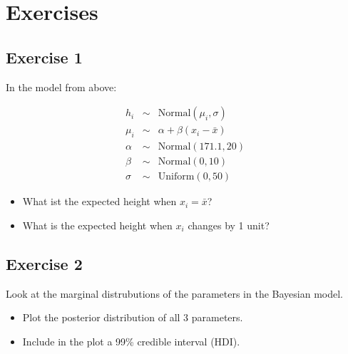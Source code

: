 \documentclass[
]{book}
\providecommand{\tightlist}{%
  \setlength{\itemsep}{0pt}\setlength{\parskip}{0pt}}
\begin{document}
\section{Exercises}\label{exercises-1}

\subsection{Exercise 1}\label{exercise1_simpl_lin_reg}

In the model from above:

\begin{eqnarray*}
h_i &\sim& \text{Normal}(\mu_i, \sigma)\\
\mu_i &\sim& \alpha + \beta (x_i - \bar{x})\\
\alpha &\sim& \text{Normal}(171.1, 20)\\
\beta &\sim& \text{Normal}(0, 10)\\
\sigma &\sim& \text{Uniform}(0, 50)
\end{eqnarray*}

\begin{itemize}
\tightlist
\item
  What ist the expected height when \(x_i = \bar{x}\)?
\item
  What is the expected height when \(x_i\) changes by 1 unit?
\end{itemize}

\subsection{Exercise 2}\label{exercise2_simpl_lin_reg}

Look at the marginal distrubutions of the parameters in the Bayesian model.

\begin{itemize}
\tightlist
\item
  Plot the posterior distribution of all 3 parameters.
\item
  Include in the plot a 99\% credible interval (HDI).
\end{itemize}


\end{document}
